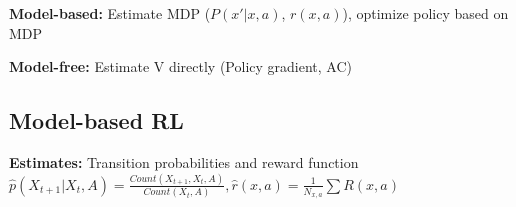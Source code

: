 \textbf{Model-based:} Estimate MDP ($P(x'|x,a)$, $r(x,a)$), optimize policy based on MDP\\
\begin{comment}
	Collect data and learn the transition probabilities and rewards.
	From there, use the standard methods to estimate the policy.\\
\end{comment}
\textbf{Model-free:} Estimate V directly (Policy gradient, AC)\\
\begin{comment}
	Learn the value function directly, since the optimal policy is greedy with respect to the value function, it is enough to know the value function to determine the optimal policy.\\
\end{comment}

\subsection{Model-based RL}
\textbf{Estimates:} Transition probabilities and reward function\\
$\hat{p}(X_{t+1} | X_t, A) = \frac{Count(X_{t+1}, X_t, A)}{Count(X_t, A)}, 
\hat{r}(x,a) = \frac{1}{N_{x,a}} \sum R(x,a)$\\
\begin{comment}
	The problem reduces to estimating the transition probabilities and reward function (MLE in this example).
	As dataset, we can use the single transitions from the trajectories, since even if the trajectory itself is not independent, the transitions are.\\
	\textbf{Supervised learning:} In this setting, we can use all the techniques from supervised learning to estimate the two functions. The input are state-action pairs, the labels are next state and reward.\\
	\textbf{Exploration vs. Exploitation:} We can always pick a random action, then we eventually learn the correct probabilities and rewards. It may take very long though.\\
	If we always pick the best action according to the current knowledge, we might see quick results, but get stuck with suboptimal actions.\\ 
	\textbf{Note:} The important distinction is that how often we observe certain state-space pairs depends on what we do. So the distribution of the inputs depends on out policy.\\
\end{comment}

